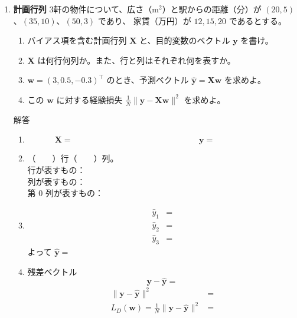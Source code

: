 \documentclass[a4paper,dvipdfmx]{jsarticle}
\newcommand{\提出期限}{2026年10月12日（月）}
\newcommand{\学籍番号}{0000000}
\newcommand{\氏名}{氏名を書く}
\newcommand{\提出日}{2026年10月12日}
\newenvironment{answer}{\begin{itembox}[l]{解答}}{\end{itembox}}
\begin{document}
\begin{enumerate}
  \item \textbf{計画行列}\quad
    3軒の物件について、広さ（$\mathrm{m}^2$）と駅からの距離（分）が
    $(20, 5)$、$(35, 10)$、$(50, 3)$ であり、
    家賃（万円）が $12, 15, 20$ であるとする。
    \begin{enumerate}
      \item バイアス項を含む計画行列 $\bm{X}$ と、目的変数のベクトル $\bm{y}$ を書け。
      \item $\bm{X}$ は何行何列か。また、行と列はそれぞれ何を表すか。
      \item $\bm{w} = (3, 0.5, -0.3)^\top$ のとき、予測ベクトル $\hat{\bm{y}} = \bm{X}\bm{w}$ を求めよ。
      \item この $\bm{w}$ に対する経験損失 $\frac{1}{N}\|\bm{y} - \bm{X}\bm{w}\|^2$ を求めよ。
    \end{enumerate}
    \begin{answer}
      \begin{enumerate}
        \item
          \begin{equation*}
            \bm{X} = \phantom{XXXXXXXXXXXXXXXX}
            \qquad
            \bm{y} = \phantom{XXXXXXXX}
          \end{equation*}
        \item （　　）行（　　）列。\\
          行が表すもの：\\[1mm]
          列が表すもの：\\[1mm]
          第 $0$ 列が表すもの：
        \item
          \begin{align*}
            \hat{y}_1 &= \\
            \hat{y}_2 &= \\
            \hat{y}_3 &=
          \end{align*}
          よって $\hat{\bm{y}} = $
        \item 残差ベクトル
          \begin{equation*}
            \bm{y} - \hat{\bm{y}} =
          \end{equation*}
          \begin{align*}
            \|\bm{y} - \hat{\bm{y}}\|^2 &= \\
            L_D(\bm{w}) = \frac{1}{N}\|\bm{y} - \hat{\bm{y}}\|^2 &=
          \end{align*}
      \end{enumerate}
    \end{answer}


\end{enumerate}
\end{document}
